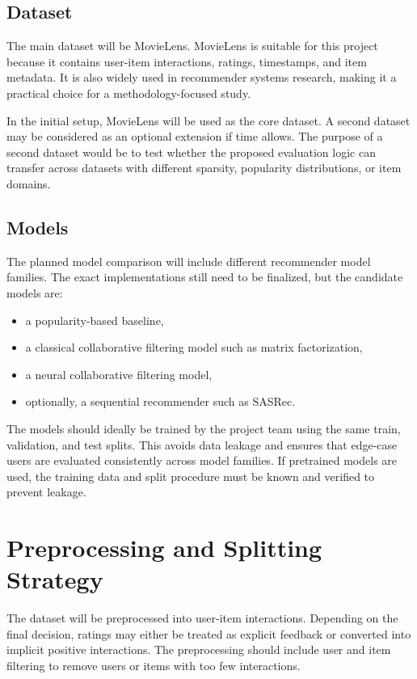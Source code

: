 \documentclass[sigconf]{acmart}
\begin{document}
\subsection{Dataset}
The main dataset will be MovieLens. MovieLens is suitable for this project because it contains user-item interactions, ratings, timestamps, and item metadata. It is also widely used in recommender systems research, making it a practical choice for a methodology-focused study.

In the initial setup, MovieLens will be used as the core dataset. A second dataset may be considered as an optional extension if time allows. The purpose of a second dataset would be to test whether the proposed evaluation logic can transfer across datasets with different sparsity, popularity distributions, or item domains.

\subsection{Models}
The planned model comparison will include different recommender model families. The exact implementations still need to be finalized, but the candidate models are:

\begin{itemize}
  \item a popularity-based baseline,
  \item a classical collaborative filtering model such as matrix factorization,
  \item a neural collaborative filtering model,
  \item optionally, a sequential recommender such as SASRec.
\end{itemize}

The models should ideally be trained by the project team using the same train, validation, and test splits. This avoids data leakage and ensures that edge-case users are evaluated consistently across model families. If pretrained models are used, the training data and split procedure must be known and verified to prevent leakage.

\section{Preprocessing and Splitting Strategy}
The dataset will be preprocessed into user-item interactions. Depending on the final decision, ratings may either be treated as explicit feedback or converted into implicit positive interactions. The preprocessing should include user and item filtering to remove users or items with too few interactions.
\end{document}
